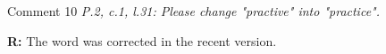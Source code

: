 \documentclass[11pt]{report}
\begin{document}
\medskip
\begin{mybox}{Comment 10}
\textit{P.2, c.1, l.31: Please change "practive" into "practice".}


\medskip
\textbf{R:} The word was corrected in the recent version.
\end{mybox}




\vspace{0.3cm}




\end{document}
